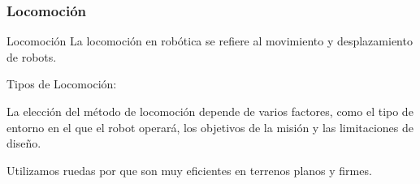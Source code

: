 \begin{frame}
    \frametitle{Locomoción}
    \footnotesize

    \begin{block}{Locomoción}
        La locomoción en robótica se refiere al movimiento y desplazamiento de robots. 
    \end{block}
    
    Tipos de Locomoción:
    
   	
   	\begin{figure}[!h]
   		\centering
   	\end{figure}

    

    La elección del método de locomoción depende de varios factores, como el tipo de entorno en el que el robot operará, los objetivos de la misión y las limitaciones de diseño. 

    Utilizamos ruedas por que son muy eficientes en terrenos planos y firmes.
\end{frame}



